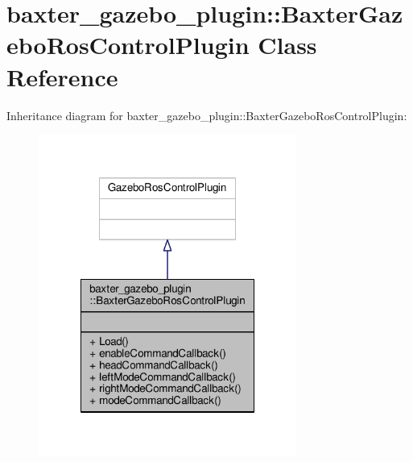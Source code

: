 \hypertarget{classbaxter__gazebo__plugin_1_1_baxter_gazebo_ros_control_plugin}{\section{baxter\-\_\-gazebo\-\_\-plugin\-:\-:Baxter\-Gazebo\-Ros\-Control\-Plugin Class Reference}
\label{classbaxter__gazebo__plugin_1_1_baxter_gazebo_ros_control_plugin}
}


Inheritance diagram for baxter\-\_\-gazebo\-\_\-plugin\-:\-:Baxter\-Gazebo\-Ros\-Control\-Plugin\-:
\nopagebreak
\begin{figure}[H]
\begin{center}
\leavevmode
\includegraphics[width=240pt]{classbaxter__gazebo__plugin_1_1_baxter_gazebo_ros_control_plugin__inherit__graph}
\end{center}
\end{figure}


